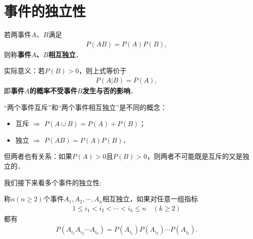 
\usepackage{ctex}



% 






\section{事件的独立性}

\begin{definition}
    若两事件$A$、$B$满足
    \begin{align*}
        P(AB)= P(A) P(B),
    \end{align*}
    则称\textbf{事件$A$、$B$相互独立}．%
\end{definition}

实际意义：若$P(B)>0$，则上式等价于
    \begin{align*}
        P(A|B)= P(A),
    \end{align*}
    即\textbf{事件$A$的概率不受事件$B$发生与否的影响}．

\begin{remark}
    “两个事件互斥”和“两个事件相互独立”是不同的概念：
    \begin{itemize}
        \item 互斥 $\Rightarrow$ $P(A\cup B)=P(A)+P(B)$；
        \item 独立 $\Rightarrow$ $P(AB)=P(A)P(B)$．
    \end{itemize}
    但两者也有关系：如果$P(A)>0$且$P(B)>0$，则两者不可能既是互斥的又是独立的．
\end{remark}

我们接下来看多个事件的独立性: 

\begin{definition}
    称$n(n\ge 2)$个事件$A_1, A_2, \cdots, A_n$相互独立，如果对任意一组指标
    \begin{align*}
        1\le i_1<i_2< \cdots <i_k\le n\quad (k\ge 2)
    \end{align*}
    都有
    \begin{align*}
        P(A_{i_1}A_{i_2}\cdots A_{i_k})=P(A_{i_1})P(A_{i_2})\cdots  P(A_{i_k}).
    \end{align*}
\end{definition}

